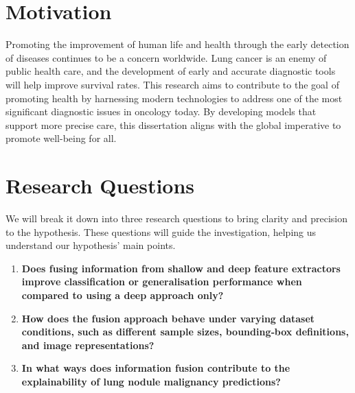 \section{Motivation}\label{sec:motivation}

Promoting the improvement of human life and health through the early detection of diseases continues to be a concern worldwide. Lung cancer is an enemy of public health care, and the development of early and accurate diagnostic tools will help improve survival rates.
This research aims to contribute to the goal of promoting health by harnessing modern technologies to address one of the most significant diagnostic issues in oncology today. By developing models that support more precise care, this dissertation aligns with the global imperative to promote well-being for all.


\section{Research Questions}\label{sec:questions}
We will break it down into three research questions to bring clarity and precision to the hypothesis. These questions will guide the investigation, helping us understand our hypothesis' main points.

\begin{enumerate}
    \item \textbf{Does fusing information from shallow and deep feature extractors improve classification or generalisation performance when compared to using a deep approach only?}\\
    \item \textbf{How does the fusion approach behave under varying dataset conditions, such as different sample sizes, bounding‐box definitions, and image representations?}\\
    \item \textbf{In what ways does information fusion contribute to the explainability of lung nodule malignancy predictions?}\\
\end{enumerate}





